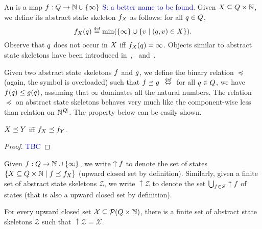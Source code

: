\documentclass[envcountsame,a4paper,12pt]{llncs}
\begin{document}
  An  is a map $f: Q \to \mathbb{N} \cup \{ \infty \}$
  \textcolor{blue}{S: a better name to be found}.
  Given $X \subseteq Q \times \mathbb{N}$, we define its abstract state skeleton $f_{X}$
  as follows: for all $q \in Q$,
  $$
  \amap_{\aset}(\alocation) \egdef
  \min (\set{\infty} \cup \set{v \mid \pair{\alocation}{v} \in \aset}). 
  $$
  Observe that $q$ does not occur in $X$ iff $f_{X}(q) = \infty$.
  Objects similar to abstract state skeletons have been introduced
  in~\cite[Section 3]{Degorreetal10},~\cite[Section 3]{Perez17} and~\cite[Section 5]{Hofman&Totzke18}.


  
  Given two abstract state skeletons $f$ and $g$, we define the binary relation
  $\preceq$ (again, the symbol is overloaded) such that
  $f \preceq g$ $\equivdef$ for all
  $q \in Q$, we have $f(q) \leq g(q)$, assuming
  that $\infty$ dominates all the natural numbers.
  The relation $\preceq$ on abstract state skeletons behaves very much like the component-wise less than
  relation on $\mathbb{N}^{{\mid\!{Q}\!\mid}}$. 
  The property below can be easily shown.

  \begin{lemma} \label{lemma-good-abstraction}
    $X \preceq Y$ iff
    $f_{X} \preceq f_{Y}$. 
  \end{lemma}

  \begin{proof} \textcolor{blue}{TBC}
  \end{proof}

  Given $f: Q \to \mathbb{N} \cup \{ \infty \}$,
  we write $\uparrow f$ to denote the
  set of states $\{ X \subseteq Q \times \mathbb{N} \mid f \preceq f_{X} \}$
  (upward closed set by definition).
  Similarly, given a finite set of abstract state skeletons $\mathcal{Z}$,
  we write $\uparrow \mathcal{Z}$ to denote the set $\bigcup_{f \in \mathcal{Z}} \uparrow f$ of states
   (that is also a upward closed set by definition).

  \begin{lemma} \label{lemma-finite-representation}
    For every upward closed set $\mathcal{X} \subseteq {\cal P}(Q \times \mathbb{N})$,
    there is a finite set of abstract state skeletons $\mathcal{Z}$ such that
     $\uparrow \mathcal{Z} = \mathcal{X}$. 
  \end{lemma}
\end{document}
